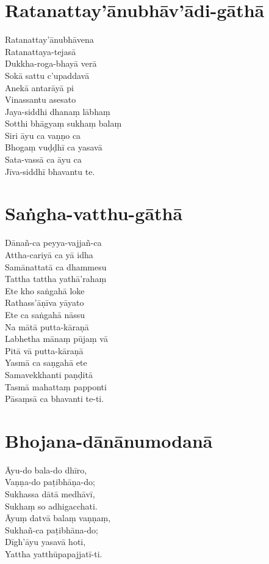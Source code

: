 \chapter{Ratanattay’ānubhāv’ādi-gāthā}

Ratanattay’ānubhāvena\\
Ratanattaya-tejasā\\
Dukkha-roga-bhayā verā\\
Sokā sattu c’upaddavā\\
Anekā antarāyā pi\\
Vinassantu asesato\\
Jaya-siddhi dhanaṃ lābhaṃ\\
Sotthi bhāgyaṃ sukhaṃ balaṃ\\
Siri āyu ca vaṇṇo ca\\
Bhogaṃ vuḍḍhī ca yasavā\\
Sata-vassā ca āyu ca\\
Jīva-siddhī bhavantu te.

\chapter{Saṅgha-vatthu-gāthā}

Dānañ-ca peyya-vajjañ-ca\\
Attha-cariyā ca yā idha\\
Samānattatā ca dhammesu\\
Tattha tattha yathā’rahaṃ\\
Ete kho saṅgahā loke\\
Rathass’āṇīva yāyato\\
Ete ca saṅgahā nāssu\\
Na mātā putta-kāraṇā\\
Labhetha mānaṃ pūjaṃ vā\\
Pitā vā putta-kāraṇā\\
Yasmā ca saṇgahā ete\\
Samavekkhanti paṇḍitā\\
Tasmā mahattaṃ papponti\\
Pāsaṃsā ca bhavanti te-ti.

\chapter{Bhojana-dānānumodanā}

Āyu-do bala-do dhīro,\\
Vaṇṇa-do paṭibhāṇa-do;\\
Sukhassa dātā medhāvī,\\
Sukhaṃ so adhigacchati.\\
Āyuṃ datvā balaṃ vaṇṇaṃ,\\
Sukhañ-ca paṭibhāna-do;\\
Dīgh’āyu yasavā hoti,\\
Yattha yatthūpapajjatī-ti.

